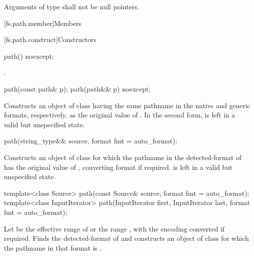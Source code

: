 \pnum
Arguments of type 
shall not be null pointers.

[fs.path.member]{Members}

[fs.path.construct]{Constructors}

%
\begin{itemdecl}
path() noexcept;
\end{itemdecl}

\begin{itemdescr}
\pnum
\ensures
{}.
\end{itemdescr}

%
\begin{itemdecl}
path(const path& p);
path(path&& p) noexcept;
\end{itemdecl}

\begin{itemdescr}
\pnum
\effects
Constructs an object of class 
having the same pathname in the native and generic formats, respectively,
as the original value of .
In the second form,  is left in a valid but unspecified state.
\end{itemdescr}

%
\begin{itemdecl}
path(string_type&& source, format fmt = auto_format);
\end{itemdecl}

\begin{itemdescr}
\pnum
\effects
Constructs an object of class 
for which the pathname in the detected-format of 
has the original value of ,
converting format if required.
 is left in a valid but unspecified state.
\end{itemdescr}

%
\begin{itemdecl}
template<class Source>
  path(const Source& source, format fmt = auto_format);
template<class InputIterator>
  path(InputIterator first, InputIterator last, format fmt = auto_format);
\end{itemdecl}

\begin{itemdescr}
\pnum
\effects
Let  be the effective range of 
or the range , with the encoding converted if required.
Finds the detected-format of 
and constructs an object of class 
for which the pathname in that format is .
\end{itemdescr}

